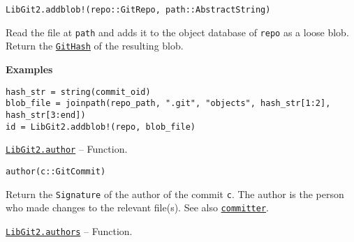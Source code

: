 \begin{adjustwidth}{2em}{0pt}


\begin{verbatim}
LibGit2.addblob!(repo::GitRepo, path::AbstractString)
\end{verbatim}

Read the file at \texttt{path} and adds it to the object database of \texttt{repo} as a loose blob. Return the \hyperlink{202290709580230708}{\texttt{GitHash}} of the resulting blob.

\textbf{Examples}


\begin{verbatim}
hash_str = string(commit_oid)
blob_file = joinpath(repo_path, ".git", "objects", hash_str[1:2], hash_str[3:end])
id = LibGit2.addblob!(repo, blob_file)
\end{verbatim}



\end{adjustwidth}
\hypertarget{7024880280540966409}{}
\hyperlink{7024880280540966409}{\texttt{LibGit2.author}}  -- {Function.}

\begin{adjustwidth}{2em}{0pt}


\begin{verbatim}
author(c::GitCommit)
\end{verbatim}

Return the \texttt{Signature} of the author of the commit \texttt{c}. The author is the person who made changes to the relevant file(s). See also \hyperlink{4819166445750615913}{\texttt{committer}}.



\end{adjustwidth}
\hypertarget{13671452176500407122}{}
\hyperlink{13671452176500407122}{\texttt{LibGit2.authors}}  -- {Function.}

